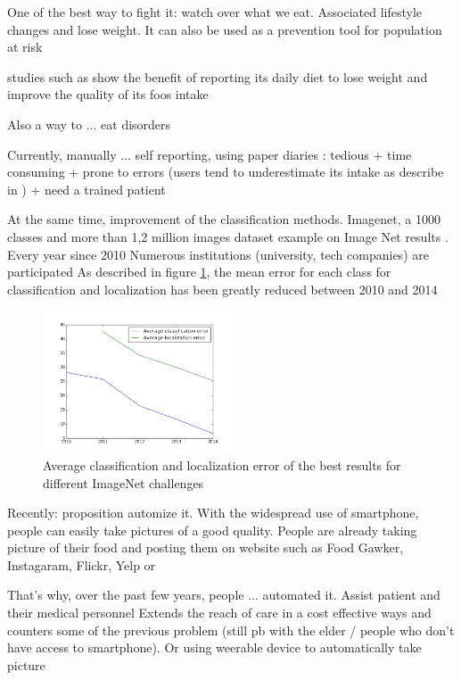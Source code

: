 One of the best way to fight it: watch over what we eat. Associated lifestyle changes and lose weight. It can also be used as a prevention tool for population at risk

studies such as \cite{Burke2011a} show the benefit of reporting its daily diet to lose weight and improve the quality of its foos intake

Also a way to ... eat disorders

Currently, manually ... self reporting, using paper diaries : tedious + time consuming + prone to errors (users tend to underestimate its intake as describe in \cite{Lichtman1992}) + need a trained patient

At the same time, improvement of the classification methods. Imagenet, a 1000 classes and more than 1,2 million images dataset example on Image Net results \cite{Russakovsky2015}.
Every year since 2010
Numerous institutions (university, tech companies) are participated
As described in figure \ref{fig:imagenet_results}, the mean error for each class for classification and localization has been greatly reduced between 2010 and 2014

\begin{figure}[h]
    \centering
    \includegraphics[width=0.5\textwidth,  height=0.455\textwidth ]{img/imagenet}
    \caption{Average classification and localization error of the best results for different ImageNet challenges}
    \label{fig:imagenet_results}
\end{figure}

Recently: proposition automize it. With the widespread use of smartphone, people can easily take pictures of a good quality. People are already taking picture of their food and posting them on website such as Food Gawker, Instagaram, Flickr, Yelp or 

That's why, over the past few years, people ... automated it. Assist patient and their medical personnel
Extends the reach of care in a cost effective ways and counters some of the previous problem (still pb with the elder / people who don't have access to smartphone). Or using weerable device to automatically take picture

